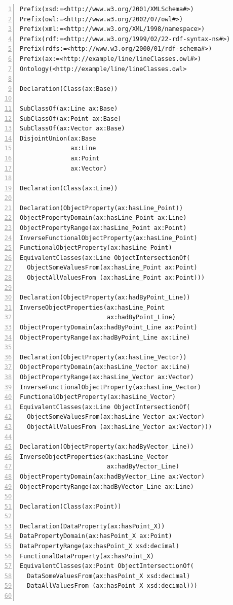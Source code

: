 \documentclass[preprint,12pt]{elsarticle}
\newenvironment{mylisting}
{\begin{list}{}{\setlength{\leftmargin}{1em}}\item\small}
{\end{list}}
\begin{document}
  \begin{mylisting}
\begin{Verbatim}[commandchars=\\\{\},numbers=left, numbersep=1pt]
Prefix(xsd:=<http://www.w3.org/2001/XMLSchema#>)
Prefix(owl:=<http://www.w3.org/2002/07/owl#>)
Prefix(xml:=<http://www.w3.org/XML/1998/namespace>)
Prefix(rdf:=<http://www.w3.org/1999/02/22-rdf-syntax-ns#>)
Prefix(rdfs:=<http://www.w3.org/2000/01/rdf-schema#>)
Prefix(ax:=<http://example/line/lineClasses.owl#>)
Ontology(<http://example/line/lineClasses.owl>

Declaration(Class(ax:Base))

SubClassOf(ax:Line ax:Base)
SubClassOf(ax:Point ax:Base)
SubClassOf(ax:Vector ax:Base)
DisjointUnion(ax:Base
              ax:Line
              ax:Point
              ax:Vector)

Declaration(Class(ax:Line))

Declaration(ObjectProperty(ax:hasLine_Point))
ObjectPropertyDomain(ax:hasLine_Point ax:Line)
ObjectPropertyRange(ax:hasLine_Point ax:Point)
InverseFunctionalObjectProperty(ax:hasLine_Point)
FunctionalObjectProperty(ax:hasLine_Point)
EquivalentClasses(ax:Line ObjectIntersectionOf(
  ObjectSomeValuesFrom(ax:hasLine_Point ax:Point)
  ObjectAllValuesFrom (ax:hasLine_Point ax:Point)))

Declaration(ObjectProperty(ax:hadByPoint_Line))
InverseObjectProperties(ax:hasLine_Point
                        ax:hadByPoint_Line)
ObjectPropertyDomain(ax:hadByPoint_Line ax:Point)
ObjectPropertyRange(ax:hadByPoint_Line ax:Line)

Declaration(ObjectProperty(ax:hasLine_Vector))
ObjectPropertyDomain(ax:hasLine_Vector ax:Line)
ObjectPropertyRange(ax:hasLine_Vector ax:Vector)
InverseFunctionalObjectProperty(ax:hasLine_Vector)
FunctionalObjectProperty(ax:hasLine_Vector)
EquivalentClasses(ax:Line ObjectIntersectionOf(
  ObjectSomeValuesFrom(ax:hasLine_Vector ax:Vector)
  ObjectAllValuesFrom (ax:hasLine_Vector ax:Vector)))

Declaration(ObjectProperty(ax:hadByVector_Line))
InverseObjectProperties(ax:hasLine_Vector
                        ax:hadByVector_Line)
ObjectPropertyDomain(ax:hadByVector_Line ax:Vector)
ObjectPropertyRange(ax:hadByVector_Line ax:Line)

Declaration(Class(ax:Point))

Declaration(DataProperty(ax:hasPoint_X))
DataPropertyDomain(ax:hasPoint_X ax:Point)
DataPropertyRange(ax:hasPoint_X xsd:decimal)
FunctionalDataProperty(ax:hasPoint_X)
EquivalentClasses(ax:Point ObjectIntersectionOf(
  DataSomeValuesFrom(ax:hasPoint_X xsd:decimal)
  DataAllValuesFrom (ax:hasPoint_X xsd:decimal)))


\end{Verbatim}
\end{mylisting}
\end{document}
